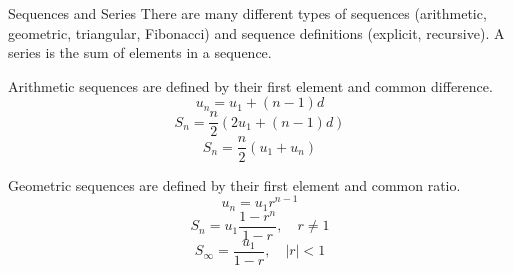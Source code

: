 \documentclass[../../main.tex]{subfiles}
\begin{document}
\begin{summary}{Sequences and Series}
    There are many different types of sequences (arithmetic, geometric, triangular, Fibonacci) and sequence definitions (explicit, recursive). A series is the sum of elements in a sequence.

    \subtitle{Arithmetic Sequences/Series}
    Arithmetic sequences are defined by their first element and common difference.
    \[
        u_n = u_1 + (n-1)d
    \]\[
        S_n = \frac{n}2(2u_1+(n-1)d)
    \]\[
        S_n = \frac{n}2(u_1 + u_n)
    \]
    
    \subtitle{Geometric Sequences/Series}
    Geometric sequences are defined by their first element and common ratio.
    \[
        u_n = u_1r^{n - 1}
    \]\[
        S_n = u_1\frac{1 - r^n}{1 - r},\quad r\neq1
    \]\[
        S_\infty = \frac{u_1}{1-r},\quad|r|<1
    \]
\end{summary}
\end{document}
